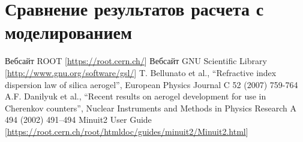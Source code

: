 \documentclass[12pt]{article}
\begin{document}
\section*{Сравнение результатов расчета с моделированием}

\begin{thebibliography}{99}
 Вебсайт ROOT [\url{https://root.cern.ch/}]
 Вебсайт GNU Scientific Library [\url{http://www.gnu.org/software/gsl/}]
 T. Bellunato et al., ``Refractive index dispersion law of silica aerogel'',
European Physics Journal C 52 (2007) 759-764
 A.F. Danilyuk et al., ``Recent results on aerogel development for use in Cherenkov counters'',
Nuclear Instruments and Methods in Physics Research A 494 (2002) 491–494
 Minuit2 User Guide [\url{https://root.cern.ch/root/htmldoc/guides/minuit2/Minuit2.html}]
\end{thebibliography}
\end{document}

